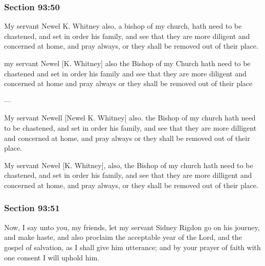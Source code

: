 	\subsubsection{Section 93:50} %
		\label{DC93-50}

		My servant Newel K. Whitney also, a bishop of my church, hath need to be chastened, and set in order his family, and see that they are more diligent and concerned at home, and pray always, or they shall be removed out of their place.

		\begin{framed}
		\scriptsize
			\begin{compactdesc}
				\item[JSP] my servant Newel [K. Whitney] also the Bishop of my Church hath need to be chastened and set in order his family and see that they are more diligent and concerned at home and pray always or they shall be removed out of their place
				\item[BC] ---
				\item[RB2] My servant Newell [Newel K. Whitney] also. the Bishop of my church hath need to be chastened, and set in order his family, and see that they are more dilligent and concerned at home, and pray always or they shall be removed out of their place. 
				\item[RB1] My servant Newel [K. Whitney], also, the Bishop of my church hath need to be chastened, and set in order his family, and see that they are more dilligent and concerned at home, and pray always, or they shall be removed out of their place. 
			\end{compactdesc}
		\end{framed}

	\subsubsection{Section 93:51} %
		\label{DC93-51}

		Now, I say unto you, my friends, let my servant Sidney Rigdon go on his journey, and make haste, and also proclaim the acceptable year of the Lord, and the gospel of salvation, as I shall give him utterance; and by your prayer of faith with one consent I will uphold him.


